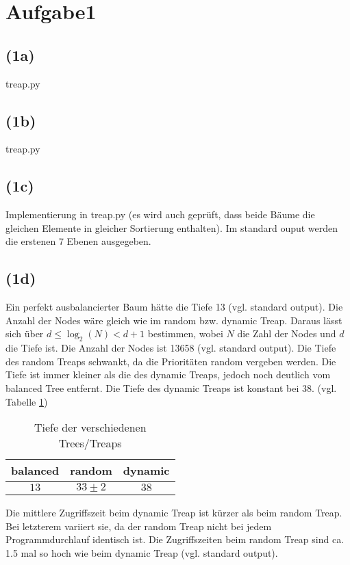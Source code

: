 \documentclass[a4paper]{article}
\begin{document}

\section*{Aufgabe1}
\subsection*{(1a)}
treap.py
\subsection*{(1b)}
treap.py
\subsection*{(1c)}
Implementierung in treap.py (es wird auch geprüft, dass beide Bäume die gleichen Elemente in gleicher Sortierung enthalten). Im standard ouput werden die erstenen 7 Ebenen ausgegeben.
\subsection*{(1d)}
Ein perfekt ausbalancierter Baum hätte die Tiefe 13 (vgl. standard output). Die Anzahl der Nodes wäre gleich wie im random bzw. dynamic Treap. Daraus lässt sich über $d \le \log_2(N) < d+1$ bestimmen, wobei $N$ die Zahl der Nodes und $d$ die Tiefe ist. Die Anzahl der Nodes ist 13658 (vgl. standard output). Die Tiefe des random Treaps schwankt, da die Prioritäten random vergeben werden. Die Tiefe ist immer kleiner als die des dynamic Treaps, jedoch noch deutlich vom balanced Tree entfernt. Die Tiefe des dynamic Treaps ist konstant bei 38. (vgl. Tabelle \ref{tab:depth})
\begin{table}
\begin{tabular}{|c|c|c|}
\hline
balanced & random & dynamic \\\hline
$13$ & $33\pm2$ & $38$ \\\hline
\end{tabular}
\caption{Tiefe der verschiedenen Trees/Treaps}
\label{tab:depth}
\end{table}

Die mittlere Zugriffszeit beim dynamic Treap ist kürzer als beim random Treap. Bei letzterem variiert sie, da der random Treap nicht bei jedem Programmdurchlauf identisch ist. Die Zugriffszeiten beim random Treap sind ca. 1.5 mal so hoch wie beim dynamic Treap (vgl. standard output).
\end{document}
